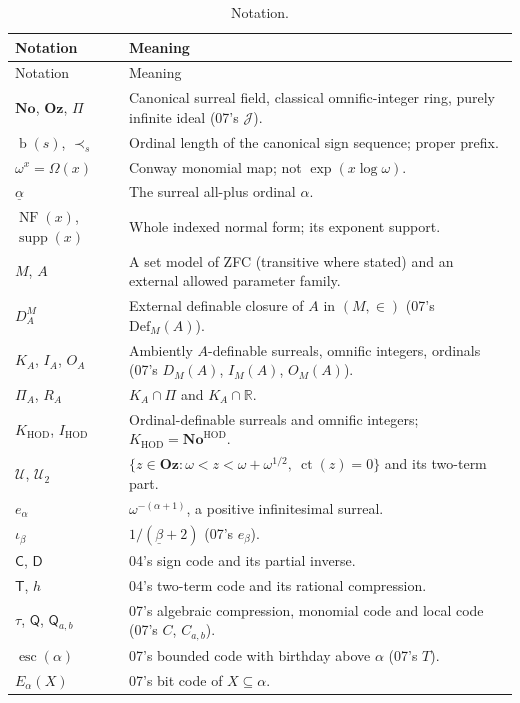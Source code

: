 \documentclass[11pt,a4paper]{article}
\numberwithin{equation}{section}
\theoremstyle{definition}
\theoremstyle{remark}
\newcommand{\No}{\mathbf{No}}
\newcommand{\Oz}{\mathbf{Oz}}
\newcommand{\HOD}{\mathrm{HOD}}
\newcommand{\R}{\mathbb R}
\newcommand{\bd}{\operatorname{b}}
\newcommand{\ct}{\operatorname{ct}}
\newcommand{\supp}{\operatorname{supp}}
\newcommand{\NF}{\operatorname{NF}}
\newcommand{\Def}{\mathrm{Def}}
\newcommand{\Code}{\mathsf C}
\newcommand{\Decode}{\mathsf D}
\newcommand{\Two}{\mathsf T}
\newcommand{\Mc}{\mathsf Q}
\newcommand{\esc}{\operatorname{esc}}
\newcommand{\Cell}{\mathcal U}
\newcommand{\KH}{K_{\HOD}}
\newcommand{\IH}{I_{\HOD}}
\newcommand{\ps}{\mathrel{\prec_s}}
\begin{document}
\begin{longtable}{@{}P{0.24\textwidth}P{0.70\textwidth}@{}}
\caption{Notation.}\label{dsn:tab:notation}\\
\toprule
Notation & Meaning\\
\midrule
\endfirsthead
\toprule
Notation & Meaning\\
\midrule
\endhead
$\No$, $\Oz$, $\Pi$ & Canonical surreal field, classical omnific-integer
ring, purely infinite ideal (07's $\mathcal J$).\\[3pt]
$\bd(s)$, $\ps$ & Ordinal length of the canonical sign sequence; proper
prefix.\\[3pt]
$\omega^x=\Omega(x)$ & Conway monomial map; not $\exp(x\log\omega)$.\\[3pt]
$\underline\alpha$ & The surreal all-plus ordinal $\alpha$.\\[3pt]
$\NF(x)$, $\supp(x)$ & Whole indexed normal form; its exponent support.\\[3pt]
$M$, $A$ & A set model of ZFC (transitive where stated) and an external
allowed parameter family.\\[3pt]
$D_A^M$ & External definable closure of $A$ in $(M,\in)$ (07's
$\Def_M(A)$).\\[3pt]
$K_A$, $I_A$, $O_A$ & Ambiently $A$-definable surreals, omnific integers,
ordinals (07's $D_M(A)$, $I_M(A)$, $O_M(A)$).\\[3pt]
$\Pi_A$, $R_A$ & $K_A\cap\Pi$ and $K_A\cap\R$.\\[3pt]
$\KH$, $\IH$ & Ordinal-definable surreals and omnific integers;
$\KH=\No^{\HOD}$.\\[3pt]
$\Cell$, $\Cell_2$ & $\{z\in\Oz:\omega<z<\omega+\omega^{1/2},\ \ct(z)=0\}$
and its two-term part.\\[3pt]
$e_\alpha$ & $\omega^{-(\alpha+1)}$, a positive infinitesimal surreal.\\[3pt]
$\iota_\beta$ & $1/(\underline\beta+2)$ (07's $e_\beta$).\\[3pt]
$\Code$, $\Decode$ & 04's sign code and its partial inverse.\\[3pt]
$\Two$, $h$ & 04's two-term code and its rational compression.\\[3pt]
$\tau$, $\Mc$, $\Mc_{a,b}$ & 07's algebraic compression, monomial code and
local code (07's $C$, $C_{a,b}$).\\[3pt]
$\esc(\alpha)$ & 07's bounded code with birthday above $\alpha$ (07's
$T$).\\[3pt]
$E_\alpha(X)$ & 07's bit code of $X\subseteq\alpha$.\\[3pt]

\end{longtable}
\end{document}
